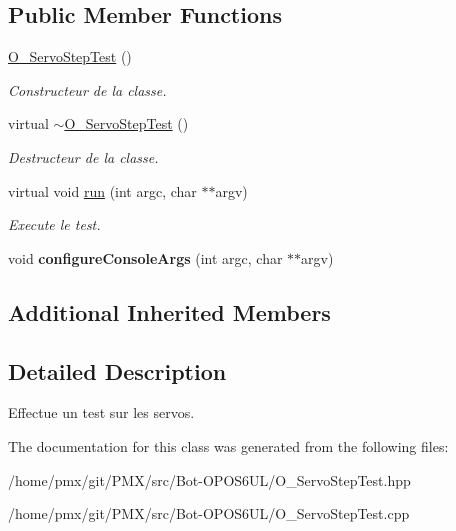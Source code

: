 \subsection*{Public Member Functions}
\begin{DoxyCompactItemize}
\item 
\mbox{\label{classO__ServoStepTest_afdee19a431a3476098b2319a75201072}} 
\hyperlink{classO__ServoStepTest_afdee19a431a3476098b2319a75201072}{O\+\_\+\+Servo\+Step\+Test} ()
\begin{DoxyCompactList}\small\item\em Constructeur de la classe. \end{DoxyCompactList}\item 
\mbox{\label{classO__ServoStepTest_a81edcbd58aeb019dc861919a10e799d3}} 
virtual \hyperlink{classO__ServoStepTest_a81edcbd58aeb019dc861919a10e799d3}{$\sim$\+O\+\_\+\+Servo\+Step\+Test} ()
\begin{DoxyCompactList}\small\item\em Destructeur de la classe. \end{DoxyCompactList}\item 
\mbox{\label{classO__ServoStepTest_aefbe5c17504e0782e71a6ca13ed40518}} 
virtual void \hyperlink{classO__ServoStepTest_aefbe5c17504e0782e71a6ca13ed40518}{run} (int argc, char $\ast$$\ast$argv)
\begin{DoxyCompactList}\small\item\em Execute le test. \end{DoxyCompactList}\item 
\mbox{\label{classO__ServoStepTest_a7579a3a63e9bd65d2f20fbd5600af511}} 
void {\bfseries configure\+Console\+Args} (int argc, char $\ast$$\ast$argv)
\end{DoxyCompactItemize}
\subsection*{Additional Inherited Members}


\subsection{Detailed Description}
Effectue un test sur les servos. 

The documentation for this class was generated from the following files\+:\begin{DoxyCompactItemize}
\item 
/home/pmx/git/\+P\+M\+X/src/\+Bot-\/\+O\+P\+O\+S6\+U\+L/O\+\_\+\+Servo\+Step\+Test.\+hpp\item 
/home/pmx/git/\+P\+M\+X/src/\+Bot-\/\+O\+P\+O\+S6\+U\+L/O\+\_\+\+Servo\+Step\+Test.\+cpp\end{DoxyCompactItemize}
